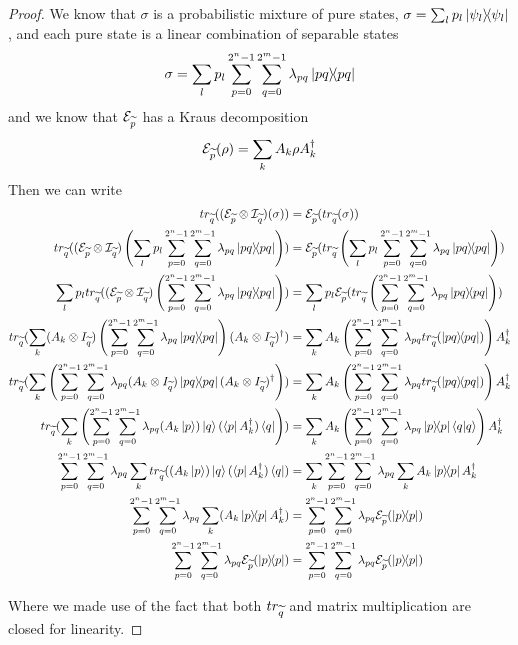 \begin{proof}
We know that $\sigma$ is a probabilistic mixture of pure states, $\sigma = \sum_l p_l \ket{\psi_l}\!\!\bra{\psi_l}$, and each pure state is a linear combination of separable states 
\[\sigma = \sum_l p_l \sum_{p = 0}^{2^n-1} \sum_{q = 0}^{2^m-1} \lambda_{pq} \ket{pq}\!\!\bra{pq}\]
and we know that $\mathcal{E}_{\widetilde{p}}$ has a Kraus decomposition 
\[\mathcal{E}_{\widetilde{p}}(\rho) = \sum_k A_k \rho A_k^\dagger\]
Then we can write 
\hspace*{-2cm}\begin{align*}
\trQ((\sop_{\widetilde{p}} \otimes \mathcal{I}_{\widetilde{q}})(\sigma)) &= \sop_{\widetilde{p}}(\trQ(\sigma)) 
\\ 
\trQ((\sop_{\widetilde{p}} \otimes \mathcal{I}_{\widetilde{q}})\left(\sum_l p_l \sum_{p = 0}^{2^n-1} \sum_{q = 0}^{2^m-1} \lambda_{pq} \proj{pq}\right)) &= \sop_{\widetilde{p}}(\trQ\left(\sum_l p_l \sum_{p = 0}^{2^n-1} \sum_{q = 0}^{2^m-1} \lambda_{pq} \proj{pq}\right))
\\
\sum_l p_l \trQ((\sop_{\widetilde{p}} \otimes \mathcal{I}_{\widetilde{q}})\left( \sum_{p = 0}^{2^n-1} \sum_{q = 0}^{2^m-1} \lambda_{pq} \proj{pq}\right)) 
&= \sum_l p_l \sop_{\widetilde{p}}(\trQ\left( \sum_{p = 0}^{2^n-1} \sum_{q = 0}^{2^m-1} \lambda_{pq} \proj{pq}\right))
\\
\trQ(\sum_k (A_k \otimes I_{\widetilde{q}})\left( \sum_{p = 0}^{2^n-1} \sum_{q = 0}^{2^m-1} \lambda_{pq} \proj{pq}\right)(A_k \otimes I_{\widetilde{q}})^\dagger )
&= \sum_k A_k\left( \sum_{p = 0}^{2^n-1} \sum_{q = 0}^{2^m-1} \lambda_{pq} \trQ(\proj{pq})\right) A_k^\dagger 
\\
\trQ(\sum_k  \left( \sum_{p = 0}^{2^n-1} \sum_{q = 0}^{2^m-1} \lambda_{pq} (A_k \otimes I_{\widetilde{q}}) \proj{pq} (A_k \otimes I_{\widetilde{q}})^\dagger  \right) )
&= \sum_k A_k\left( \sum_{p = 0}^{2^n-1} \sum_{q = 0}^{2^m-1} \lambda_{pq} \trQ(\proj{pq})\right) A_k^\dagger
\\
\trQ(\sum_k  \left( \sum_{p = 0}^{2^n-1} \sum_{q = 0}^{2^m-1} \lambda_{pq} (A_k\ket{p})\ket{q}(\bra{p}A_k^\dagger) \bra{q} \right) )
&= \sum_k A_k\left( \sum_{p = 0}^{2^n-1} \sum_{q = 0}^{2^m-1} \lambda_{pq} \proj{p}\braket{q | q}\right)A_k^\dagger
\\
\sum_{p = 0}^{2^n-1} \sum_{q = 0}^{2^m-1} \lambda_{pq} \sum_k \trQ( (A_k\ket{p})\ket{q}(\bra{p}A_k^\dagger) \bra{q} ) 
&= \sum_k  \sum_{p = 0}^{2^n-1} \sum_{q = 0}^{2^m-1} \lambda_{pq} \sum_k  A_k \proj{p} A_k^\dagger 
\\
\sum_{p = 0}^{2^n-1} \sum_{q = 0}^{2^m-1} \lambda_{pq} \sum_k (A_k \proj{p} A_k^\dagger) 
&=  \sum_{p = 0}^{2^n-1} \sum_{q = 0}^{2^m-1} \lambda_{pq} \sop_{\widetilde{p}} (\proj{p})
\\
\sum_{p = 0}^{2^n-1} \sum_{q = 0}^{2^m-1} \lambda_{pq} \sop_{\widetilde{p}}(\proj{p})
&=  \sum_{p = 0}^{2^n-1} \sum_{q = 0}^{2^m-1} \lambda_{pq} \sop_{\widetilde{p}} (\proj{p})
\end{align*}

Where we made use of the fact that both $tr_{\widetilde{q}}$ and matrix multiplication are closed for linearity.
\end{proof}

